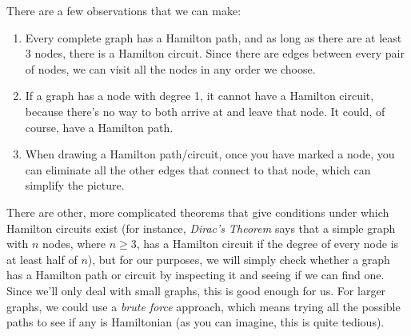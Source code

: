 There are a few observations that we can make:
\begin{enumerate}
\item Every complete graph has a Hamilton path, and as long as there are at least 3 nodes, there is a Hamilton circuit.  Since there are edges between every pair of nodes, we can visit all the nodes in any order we choose.
\item If a graph has a node with degree 1, it cannot have a Hamilton circuit, because there's no way to both arrive at and leave that node.  It could, of course, have a Hamilton path.
\item When drawing a Hamilton path/circuit, once you have marked a node, you can eliminate all the other edges that connect to that node, which can simplify the picture.
\end{enumerate}

There are other, more complicated theorems that give conditions under which Hamilton circuits exist (for instance, \emph{Dirac's Theorem} says that a simple graph with $n$ nodes, where $n \geq 3$, has a Hamilton circuit if the degree of every node is at least half of $n$), but for our purposes, we will simply check whether a graph has a Hamilton path or circuit by inspecting it and seeing if we can find one.  Since we'll only deal with small graphs, this is good enough for us.  For larger graphs, we could use a \emph{brute force} approach, which means trying all the possible paths to see if any is Hamiltonian (as you can imagine, this is quite tedious).

